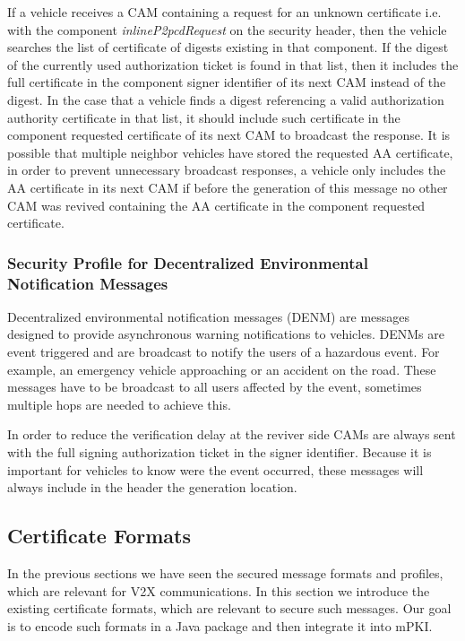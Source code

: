 If a vehicle receives a CAM containing a request for an unknown certificate i.e. with the component \textit{inlineP2pcdRequest} on the security header, then the vehicle searches the list of certificate of digests existing in that component. If the digest of the currently used authorization ticket is found in that list, then it includes the full certificate in the component signer identifier of its next CAM instead of the digest. In the case that a vehicle finds a digest referencing a valid authorization authority certificate in that list, it should include such certificate in the component requested certificate of its next CAM to broadcast the response. It is possible that multiple neighbor vehicles have stored the requested AA certificate, in order to prevent unnecessary broadcast responses, a vehicle only includes the AA certificate in its next CAM if before the generation of this message no other CAM was revived containing the AA certificate in the component requested certificate.  


\subsubsection{Security Profile for Decentralized Environmental Notification Messages} 
Decentralized environmental notification messages (DENM) are messages designed to provide asynchronous warning notifications to vehicles. DENMs are event triggered and are broadcast to notify the users of a hazardous event. For example, an emergency vehicle approaching or an accident on the road. These messages have to be broadcast to all users affected by the event, sometimes multiple hops are needed to achieve this.

In order to reduce the verification delay at the reviver side CAMs are always sent with the full signing authorization ticket in the signer identifier. Because it is important for vehicles to know were the event occurred, these messages will always include in the header the generation location.

\subsection{Certificate Formats}\label{cert_formats}
In the previous sections we have seen the secured message formats and profiles, which are relevant for V2X communications. In this section we introduce the existing certificate formats, which are relevant to secure such messages. Our goal is to encode such formats in a Java package and then integrate it into mPKI.


